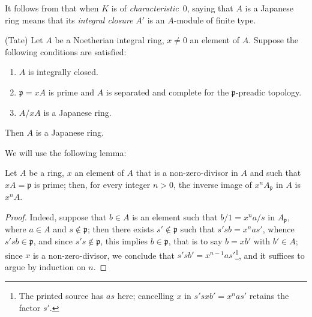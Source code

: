 It follows from  that when $K$ is of \emph{characteristic}~$0$, saying that $A$ is a Japanese ring means that its \emph{integral closure} $A'$ is an $A$-module of finite type.

\begin{theorem}[23.1.3]
\label{0.23.1.3}
\textnormal{(Tate)}
Let $A$ be a Noetherian integral ring, $x\neq 0$ an element of $A$.
Suppose the following conditions are satisfied:
\begin{enumerate}
  \item[{\rm(i)}] $A$ is integrally closed.
  \item[{\rm(ii)}] $\mathfrak{p}=xA$ is prime and $A$ is separated and complete for the $\mathfrak{p}$-preadic topology.
  \item[{\rm(iii)}] $A/xA$ is a Japanese ring.
\end{enumerate}
Then $A$ is a Japanese ring.
\end{theorem}

We will use the following lemma:

\begin{lemma}[23.1.3.1]
\label{0.23.1.3.1}
Let $A$ be a ring, $x$ an element of $A$ that is a non-zero-divisor in $A$ and such that $xA=\mathfrak{p}$ is prime; then, for every integer $n>0$, the inverse image of $x^nA_\mathfrak{p}$ in $A$ is $x^nA$.
\end{lemma}

\begin{proof}
Indeed, suppose that $b\in A$ is an element such that $b/1=x^na/s$ in $A_\mathfrak{p}$, where $a\in A$ and $s\notin\mathfrak{p}$; then there exists $s'\notin\mathfrak{p}$ such that $s'sb=x^nas'$, whence $s'sb\in\mathfrak{p}$, and since $s's\notin\mathfrak{p}$, this implies $b\in\mathfrak{p}$, that is to say $b=xb'$ with $b'\in A$; since $x$ is a non-zero-divisor, we conclude that $s'sb'=x^{n-1}as'$\footnote{The printed source has $as$ here; cancelling $x$ in $s'sxb'=x^nas'$ retains the factor $s'$.}, and it suffices to argue by induction on $n$.
\end{proof}

